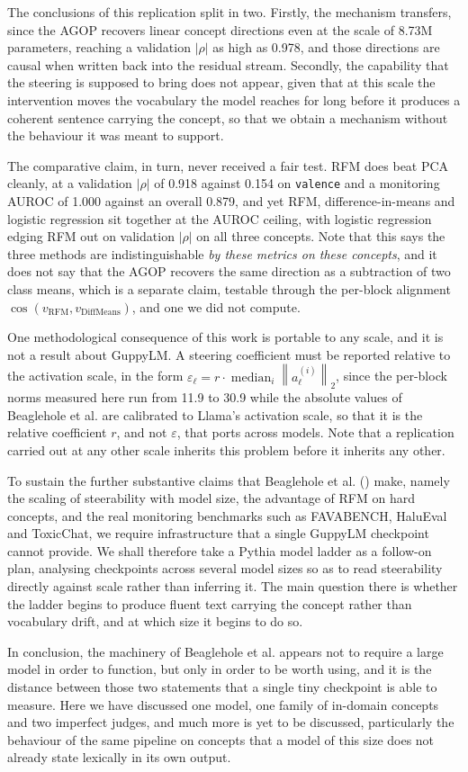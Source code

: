 The conclusions of this replication split in two. Firstly, the mechanism transfers, since
the AGOP recovers linear concept directions even at the scale of 8.73M parameters,
reaching a validation $|\rho|$ as high as 0.978, and those directions are causal when
written back into the residual stream. Secondly, the capability that the steering is
supposed to bring does not appear, given that at this scale the intervention moves the
vocabulary the model reaches for long before it produces a coherent sentence carrying the
concept, so that we obtain a mechanism without the behaviour it was meant to support.

The comparative claim, in turn, never received a fair test. RFM does beat PCA cleanly, at
a validation $|\rho|$ of 0.918 against 0.154 on \verb|valence| and a monitoring AUROC of
1.000 against an overall 0.879, and yet RFM, difference-in-means and logistic regression
sit together at the AUROC ceiling, with logistic regression edging RFM out on validation
$|\rho|$ on all three concepts. Note that this says the three methods are indistinguishable
\emph{by these metrics on these concepts}, and it does not say that the AGOP recovers the
same direction as a subtraction of two class means, which is a separate claim, testable
through the per-block alignment
$\cos\left(v_{\mathrm{RFM}}, v_{\mathrm{DiffMeans}}\right)$, and one we did not compute.

One methodological consequence of this work is portable to any scale, and it is not a
result about GuppyLM. A steering coefficient must be reported relative to the activation
scale, in the form
$\varepsilon_\ell = r \cdot \operatorname*{median}_{i} \left\| a_\ell^{(i)} \right\|_2$,
since the per-block norms measured here run from 11.9 to 30.9 while the absolute values of
Beaglehole et al. are calibrated to Llama's activation scale, so that it is the relative
coefficient $r$, and not $\varepsilon$, that ports across models. Note that a replication
carried out at any other scale inherits this problem before it inherits any other.

To sustain the further substantive claims that Beaglehole et al. (\cite{beaglehole2026toward})
make, namely the scaling of steerability with model size, the advantage of RFM on hard
concepts, and the real monitoring benchmarks such as FAVABENCH, HaluEval and ToxicChat, we
require infrastructure that a single GuppyLM checkpoint cannot provide. We shall therefore
take a Pythia model ladder as a follow-on plan, analysing checkpoints across several model
sizes so as to read steerability directly against scale rather than inferring it. The main
question there is whether the ladder begins to produce fluent text carrying the concept
rather than vocabulary drift, and at which size it begins to do so.

In conclusion, the machinery of Beaglehole et al. appears not to require a large model in
order to function, but only in order to be worth using, and it is the distance between
those two statements that a single tiny checkpoint is able to measure. Here we have
discussed one model, one family of in-domain concepts and two imperfect judges, and much
more is yet to be discussed, particularly the behaviour of the same pipeline on concepts
that a model of this size does not already state lexically in its own output.
